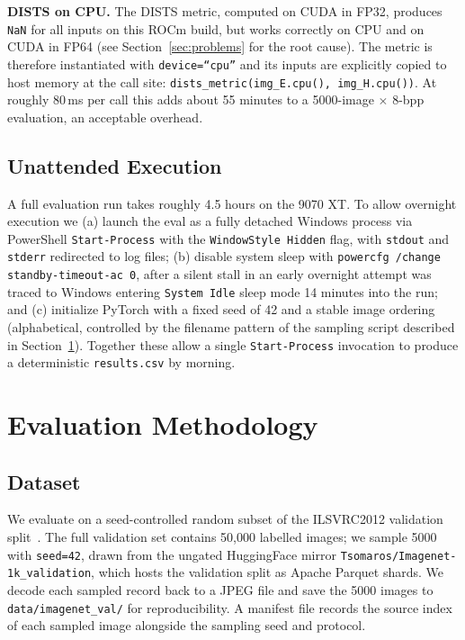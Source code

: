 \documentclass[conference]{IEEEtran}
\begin{document}
\textbf{DISTS on CPU.}
The DISTS metric, computed on CUDA in FP32, produces \texttt{NaN} for all
inputs on this ROCm build, but works correctly on CPU and on CUDA in FP64
(see Section~\ref{sec:problems} for the root cause). The metric is therefore
instantiated with \texttt{device=``cpu''} and its inputs are explicitly copied
to host memory at the call site: \texttt{dists\_metric(img\_E.cpu(),
img\_H.cpu())}. At roughly 80\,ms per call this adds about 55 minutes to a
5000-image $\times$ 8-bpp evaluation, an acceptable overhead.

\subsection{Unattended Execution}

A full evaluation run takes roughly 4.5 hours on the 9070 XT. To allow
overnight execution we (a) launch the eval as a fully detached Windows
process via PowerShell \texttt{Start-Process} with the
\texttt{WindowStyle Hidden} flag, with \texttt{stdout} and \texttt{stderr}
redirected to log files; (b) disable system sleep with
\texttt{powercfg /change standby-timeout-ac 0}, after a silent stall in an
early overnight attempt was traced to Windows entering \texttt{System Idle}
sleep mode 14 minutes into the run; and (c) initialize PyTorch with a fixed
seed of 42 and a stable image ordering (alphabetical, controlled by the
filename pattern of the sampling script described in
Section~\ref{sec:methodology}). Together these allow a single
\texttt{Start-Process} invocation to produce a deterministic
\texttt{results.csv} by morning.

\section{Evaluation Methodology}
\label{sec:methodology}

\subsection{Dataset}

We evaluate on a seed-controlled random subset of the ILSVRC2012 validation
split~\cite{imagenet}. The full validation set contains 50{,}000 labelled
images; we sample 5000 with \texttt{seed=42}, drawn from the ungated
HuggingFace mirror \texttt{Tsomaros/Imagenet-1k\_validation}, which hosts the
validation split as Apache Parquet shards. We decode each sampled record back
to a JPEG file and save the 5000 images to \texttt{data/imagenet\_val/} for
reproducibility. A manifest file records the source index of each sampled
image alongside the sampling seed and protocol.
\end{document}
